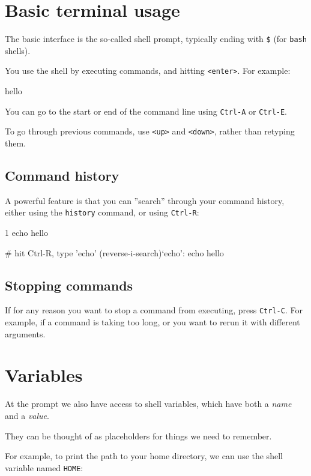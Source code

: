 \section{Basic terminal usage}

The basic interface is the so-called shell prompt, typically ending with \verb|$|
(for \verb|bash| shells).

You use the shell by executing commands, and hitting \verb|<enter>|. For example:

\begin{prompt}
hello
\end{prompt}

You can go to the start or end of the command line using \verb|Ctrl-A| or \verb|Ctrl-E|.

To go through previous commands, use \verb|<up>| and \verb|<down>|, rather than retyping them.

\subsection{Command history}

A powerful feature is that you can ''search'' through your command history, either using the \verb|history| command, or using \verb|Ctrl-R|:

\begin{prompt}
    1  echo hello

# hit Ctrl-R, type 'echo'
(reverse-i-search)`echo': echo hello
\end{prompt}

\subsection{Stopping commands}
If for any reason you want to stop a command from executing, press \verb|Ctrl-C|. For
example, if a command is taking too long, or you want to rerun it with different arguments.

\section{Variables}

At the prompt we also have access to shell variables, which have both a \emph{name} and a \emph{value}.

They can be thought of as placeholders for things we need to remember.

For example, to print the path to your home directory, we can use the shell variable named \verb|HOME|:

